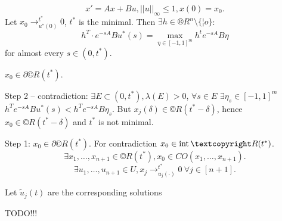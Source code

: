 \documentclass[12pt]{article}					%
\begin{document}
\begin{veta}
	$$ x' = Ax + Bu, ||u||_∞ ≤ 1, x(0) = x_0. $$
	Let $x_0 \rightarrow^{t^*}_{u^*(0)} 0$, $t^*$ is the minimal. Then $\exists h \in ®R^n \setminus \{¦o\}$:
	$$ h^T·e^{-s A} B u^*(s) = \max_{\eta \in [-1, 1]^m} h^t e^{-sA} B \eta $$
	for almost every $s \in (0, t^*)$.

	\begin{dukazin}
		$x_0 \in \partial ©R(t^*)$.

		Step 2 – contradiction: $\exists E \subset (0, t^*), \lambda(E) > 0$, $\forall s \in E$ $\exists \eta_s \in [-1, 1]^m$ $h^T e^{-sA}B u^*(s) < h^T e^{-sA} B \eta_s$. But $x_j(\delta) \in ©R(t^* - \delta)$, hence $x_0 \in ©R(t^* - \delta)$ and $t^*$ is not minimal.

		Step 1: $x_0 \in \partial ©R(t^*)$. For contradiction $x_0 \in \Int ©R(t^*)$.
		$$ \exists x_1, …, x_{n+1} \in ©R(t^*), x_0 \in CO(x_1, …, x_{n+1}). $$
		$$ \exists u_1, …, u_{n+1} \in U, x_j \rightarrow_{u_j(·)}^{t^*} 0\ \forall j \in [n+1]. $$

		Let $\tilde u_j(t)$ are the corresponding solutions

		TODO!!!
	\end{dukazin}
\end{veta}


\end{document}
